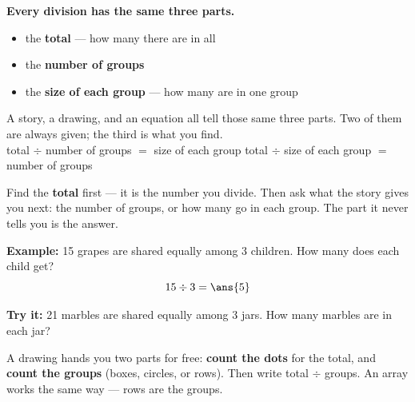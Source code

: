 \documentclass[12pt]{article}
\begin{document}

\begin{formulabox}
\textbf{Every division has the same three parts.}
\begin{itemize}[leftmargin=0.9cm, itemsep=1pt, topsep=1pt]
\item the \textbf{total} --- how many there are in all
\item the \textbf{number of groups}
\item the \textbf{size of each group} --- how many are in one group
\end{itemize}
A story, a drawing, and an equation all tell those same three parts. Two of them
are always given; the third is what you find.\\[2pt]
total $\div$ number of groups $=$ size of each group \qquad
total $\div$ size of each group $=$ number of groups
\end{formulabox}


\begin{formulabox}
Find the \textbf{total} first --- it is the number you divide. Then ask what the
story gives you next: the number of groups, or how many go in each group. The
part it never tells you is the answer.
\end{formulabox}

\begin{examplebox}
\textbf{Example:} 15 grapes are shared equally among 3 children. How many does
each child get?
\[ 15 \div 3 = \ans{5} \]
\end{examplebox}

\begin{tryitbox}
\textbf{Try it:} 21 marbles are shared equally among 3 jars. How many marbles
are in each jar?\\[2pt]
\end{tryitbox}


\begin{formulabox}
A drawing hands you two parts for free: \textbf{count the dots} for the total,
and \textbf{count the groups} (boxes, circles, or rows). Then write
total $\div$ groups. An array works the same way --- rows are the groups.
\end{formulabox}
\end{document}
